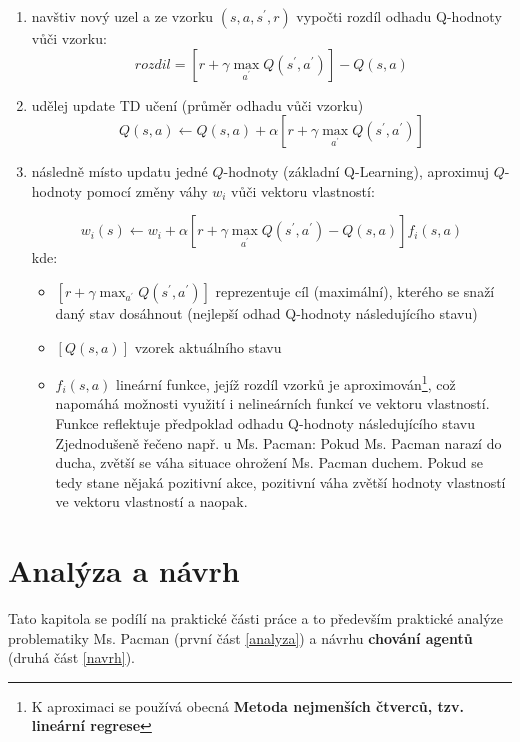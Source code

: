\begin{enumerate}

\item navštiv nový uzel a ze vzorku $(s,a,s^\prime,r)$ vypočti rozdíl odhadu Q-hodnoty vůči vzorku:
\begin{displaymath}
 rozdil = \left [ r + \gamma \max_{a^\prime}Q(s^\prime,a^\prime) \right]  - Q(s,a) 
\end{displaymath}
\item udělej update TD učení (průměr odhadu vůči vzorku)
\begin{displaymath}
 Q(s,a) \leftarrow  Q(s,a) + \alpha \left [ r + \gamma \max_{a^\prime}Q(s^\prime,a^\prime) \right]
\end{displaymath}
\item následně místo updatu jedné $Q$-hodnoty (základní Q-Learning), aproximuj $Q$-hodnoty pomocí změny váhy $w_i$ vůči vektoru vlastností:

\begin{displaymath}
w_i(s) \leftarrow w_i + \alpha \left [ r + \gamma \max_{a^\prime}Q(s^\prime,a^\prime) - Q(s,a) \right] f_i(s,a)
\end{displaymath}
kde:
\begin{itemize}
	\item $\left [ r + \gamma \max_{a^\prime}Q(s^\prime,a^\prime)\right] $ reprezentuje cíl (maximální), kterého se snaží daný stav dosáhnout (nejlepší odhad Q-hodnoty následujícího stavu)
	\item $\left [ Q(s,a)\right]$ vzorek aktuálního stavu
	\item $f_i(s,a)$ lineární funkce, jejíž rozdíl vzorků je aproximován\footnote{K aproximaci se používá obecná \textbf{Metoda nejmenších čtverců, tzv. lineární regrese}}, což napomáhá možnosti využití i nelineárních funkcí ve vektoru vlastností. Funkce reflektuje předpoklad odhadu Q-hodnoty následujícího stavu\newline
	Zjednodušeně řečeno např. u Ms. Pacman: Pokud Ms. Pacman narazí do ducha, zvětší se váha situace ohrožení Ms. Pacman duchem. Pokud se tedy stane nějaká pozitivní akce, pozitivní váha zvětší hodnoty vlastností ve vektoru vlastností a naopak.
\end{itemize}

\end{enumerate}

\chapter{Analýza a návrh}
Tato kapitola se podílí na praktické části práce a to především praktické analýze problematiky Ms. Pacman (první část \ref{analyza}) a návrhu \textbf{chování agentů} (druhá část \ref{navrh}).


